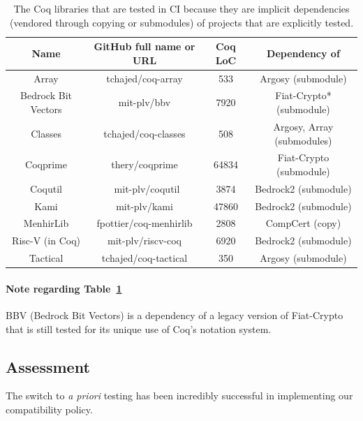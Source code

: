 \begin{table}
	\begin{center}
		\begin{tabular}{|c|c|c|c|}
			\hline
			\textbf{Name} & \textbf{GitHub full name or URL} & \textbf{Coq LoC} & \textbf{Dependency of} \\
			\hline
			Array & tchajed/coq-array & 533 & Argosy (submodule) \\
			\hline
			Bedrock Bit Vectors & mit-plv/bbv & 7920 & Fiat-Crypto* (submodule) \\
			\hline
			Classes & tchajed/coq-classes & 508 & Argosy, Array (submodules) \\
			\hline
			Coqprime & thery/coqprime & 64834 & Fiat-Crypto (submodule) \\
			\hline
			Coqutil & mit-plv/coqutil & 3874 & Bedrock2 (submodule) \\
			\hline
			Kami & mit-plv/kami & 47860 & Bedrock2 (submodule) \\
			\hline
			MenhirLib & fpottier/coq-menhirlib & 2808 & CompCert (copy) \\
			\hline
			Risc-V (in Coq) & mit-plv/riscv-coq & 6920 & Bedrock2 (submodule) \\
			\hline
			Tactical & tchajed/coq-tactical & 350 & Argosy (submodule) \\
			\hline
		\end{tabular}
	\end{center}
	\caption{
		The Coq libraries that are tested in CI because they are implicit dependencies (vendored through copying or submodules) of projects that are explicitly tested.
	}
	\label{tab:implicit-dependencies}
\end{table}

\paragraph{Note regarding Table~\ref{tab:implicit-dependencies}}

BBV (Bedrock Bit Vectors) is a dependency of a legacy version of Fiat-Crypto that is still tested for its unique use of Coq's notation system.

\subsection{Assessment}

\label{sec:lessons-learned}

The switch to \emph{a priori} testing has been incredibly successful in implementing our compatibility policy.

